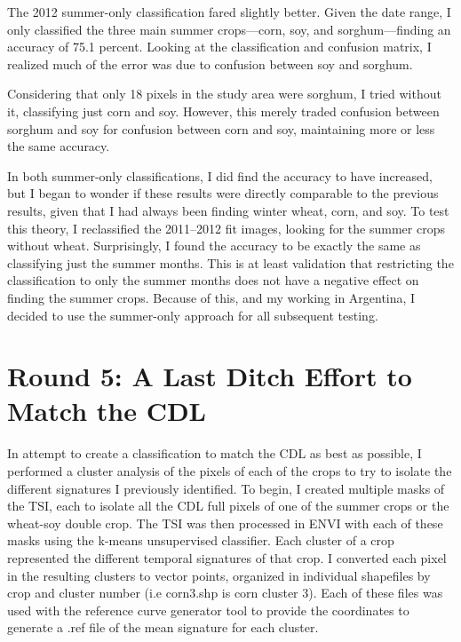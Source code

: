 The 2012 summer-only classification fared slightly better. Given the date range, I only classified the three main summer crops---corn, soy, and sorghum---finding an accuracy of 75.1 percent. Looking at the classification and confusion matrix, I realized much of the error was due to confusion between soy and sorghum. %

Considering that only 18 pixels in the study area were sorghum, I tried without it, classifying just corn and soy. However, this merely traded confusion between sorghum and soy for confusion between corn and soy, maintaining more or less the same accuracy. %

In both summer-only classifications, I did find the accuracy to have increased, but I began to wonder if these results were directly comparable to the previous results, given that I had always been finding winter wheat, corn, and soy. To test this theory, I reclassified the 2011--2012 fit images, looking for the summer crops without wheat. Surprisingly, I found the accuracy to be exactly the same as classifying just the summer months. %
This is at least validation that restricting the classification to only the summer months does not have a negative effect on finding the summer crops. Because of this, and my working in Argentina, I decided to use the summer-only approach for all subsequent testing.

\section{Round 5: A Last Ditch Effort to Match the CDL}


In attempt to create a classification to match the CDL as best as possible, I performed a cluster analysis of the pixels of each of the crops to try to isolate the different signatures I previously identified. To begin, I created multiple masks of the TSI, each to isolate all the CDL full pixels of one of the summer crops or the wheat-soy double crop. The TSI was then processed in ENVI with each of these masks using the k-means unsupervised classifier. Each cluster of a crop represented the different temporal signatures of that crop. I converted each pixel in the resulting clusters to vector points, organized in individual shapefiles by crop and cluster number (i.e corn3.shp is corn cluster 3). Each of these files was used with the reference curve generator tool to provide the coordinates to generate a .ref file of the mean signature for each cluster.

